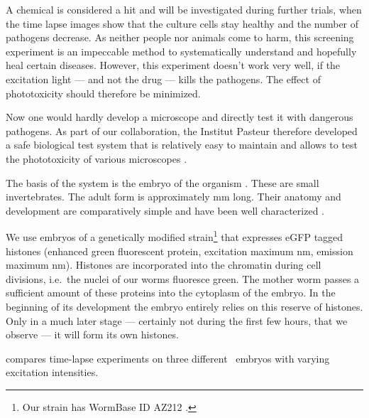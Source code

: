 A chemical is considered a hit and will be investigated during further
trials, when the time lapse images show that the culture cells stay
healthy and the number of pathogens decrease. As neither people nor
animals come to harm, this screening experiment is an impeccable
method to systematically understand and hopefully heal certain
diseases. However, this experiment doesn't work very well, if the
excitation light --- and not the drug --- kills the pathogens. The
effect of phototoxicity should therefore be minimized.


Now one would hardly develop a microscope and directly test it with
dangerous pathogens. As part of our collaboration, the Institut
Pasteur therefore developed a safe biological test system that is
relatively easy to maintain \citep{Stiernagle2006} and allows to test
the phototoxicity of various microscopes \citep{Tinevez2012}.




The basis of the system is the embryo of the organism \celegans. These
are small invertebrates. The adult form is approximately \unit[1]{mm}
long.  Their anatomy and development are comparatively simple and have
been well characterized \citep{Sulston1977,Durbin1987}.

  

We use embryos of a genetically modified strain\footnote{Our strain
  has WormBase ID AZ212 \citep{Praitis2001}.} that expresses eGFP
tagged histones (enhanced green fluorescent protein, excitation
maximum \unit[488]{nm}, emission maximum \unit[509]{nm}). Histones are
incorporated into the chromatin during cell divisions, i.e.\ the
nuclei of our worms fluoresce green.  The mother worm passes a
sufficient amount of these proteins into the cytoplasm of the
embryo. In the beginning of its development the embryo entirely relies
on this reserve of histones. Only in a much later stage --- certainly
not during the first few hours, that we observe --- it will form its
own histones.

 compares time-lapse experiments on three  
different \celegans\ embryos with varying
excitation intensities.

